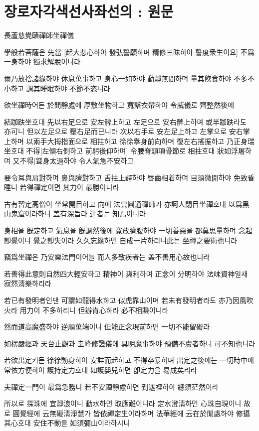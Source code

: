 \documentclass[12pt, a4paper, oneside]{book}
\let\stdsection\section
\renewcommand\section{\newpage\stdsection}
\begin{document}
	\section{장로자각색선사좌선의 : 원문}



長蘆慈覺賾禪師坐禪儀

學般若菩薩은 先當 [起大悲心하야 發弘誓願하며 精修三昧하야 誓度衆生이요] 不爲一身하야 獨求解脫이니라

爾乃放捨諸緣하야 休息萬事하고 身心一如하야 動靜無間하며 量其飮食하야 不多不小하고 調其睡眠하야 不節不恣니라

欲坐禪時어든 於閒靜處에 厚敷坐物하고 寬繫衣帶하야 令威儀로 齊整然後에

結跏趺坐호대 先以右足으로 安左髀上하고 左足으로 安右髀上하며 或半跏趺라도 亦可니 但以左足으로 壓右足而已니라 次以右手로 安左足上하고 左掌으로 安右掌上하며 以兩手大拇指面으로 相拄하고 徐徐擧身前向하며 復左右搖振하고 乃正身瑞坐호대 不得[左傾右側하고 前躬後仰하며] 令腰脊頭項骨節로 相拄호대 狀如浮屠하며 又不得[聳身太過하야 令人氣急不安하고

要令耳與肩對하며 鼻與臍對하고 舌拄上齶하야 唇齒相着하며 目須微開하야 免致昏睡니 若得禪定이면 其力이 最勝이니라

古有習定高僧이 坐常開目하고 向에 法雲圓通禪師가 亦訶人閉目坐禪호대 以爲黑山鬼窟이라하니 盖有深旨라 達者는 知焉이니라

身相을 旣定하고 氣息을 旣調然後에 寬放臍腹하야 一切善惡을 都莫思量하며 念起卽覺이니 覺之卽失이라 久久忘緣하면 自成一片하리니此는 坐禪之要術也니라

竊爲坐禪은 乃安樂法門이어늘 而人多致疾者는 盖不善用心故也니라

若善得此意則自然四大輕安하고 精神이 爽利하며 正念이 分明하야 法味資神일새 寂然淸樂하리라

若已有發明者인댄 可謂如龍得水하고 似虎靠山이며 若未有發明者라도 亦乃因風吹火라 用力이 不多하리니 但辦肯心하라 必不相賺이니라

然而道高魔盛하야 逆順萬端이니 但能正念現前하면 一切不能留礙라

如楞嚴經과 天台止觀과 圭峰修證儀에 具明魔事하야 預備不虞者하니 可不知也니라

若欲出定커든 徐徐動身하야 安詳而起하고 不得卒暴하며 出定之後에는 一切時中에 常依方便하야 護持定力호대 如護嬰兒하면 卽定力을 易成矣리라

夫禪定一門이 最爲急務니 若不安禪靜慮하면 到遮裡하야 總須茫然이라

所以로 探珠에 宜靜浪이니 動水하면 取應難이니라 定水澄淸하면 心珠自現이니 故로 圓覺經에 云無礙淸淨慧가 皆依禪定生이라하며 法華經에 云在於閒處하야 修攝其心호대 安住不動을 如須彌山이라하시니
\end{document}

